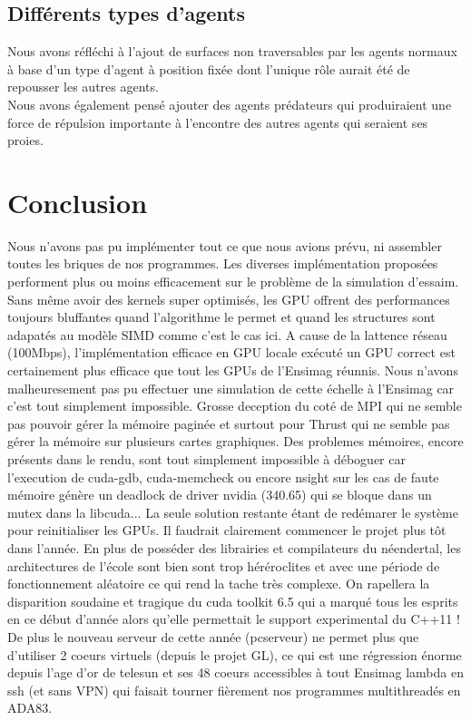 \subsection{Différents types d'agents}
Nous avons réfléchi à l'ajout de surfaces non traversables par les agents normaux à base d'un type d'agent à position fixée dont l'unique rôle aurait été de repousser les autres agents.\\
Nous avons également pensé ajouter des agents prédateurs qui produiraient une force de répulsion importante à l'encontre des autres agents qui seraient ses proies.


\section{Conclusion}

Nous n'avons pas pu implémenter tout ce que nous avions prévu, ni assembler toutes les briques de nos programmes. 
Les diverses implémentation proposées performent plus ou moins efficacement sur le problème de la simulation d'essaim.
\vskip 0.2cm
Sans même avoir des kernels super optimisés, les GPU offrent des performances toujours bluffantes quand l'algorithme le permet et quand les structures sont adapatés au modèle SIMD comme c'est le cas ici.
\vskip 0.2cm
A cause de la lattence réseau (100Mbps), l'implémentation efficace en GPU locale exécuté un GPU correct est certainement plus efficace que tout les GPUs de l'Ensimag réunnis. Nous n'avons malheuresement pas pu effectuer une simulation de cette échelle à l'Ensimag car c'est tout simplement impossible.
\vskip 0.2cm
Grosse deception du coté de MPI qui ne semble pas pouvoir gérer la mémoire paginée et surtout pour Thrust qui ne semble pas gérer la mémoire sur plusieurs cartes graphiques. Des problemes mémoires, encore présents dans le rendu, sont tout simplement impossible à déboguer car l'execution de cuda-gdb, cuda-memcheck ou encore nsight sur les cas de faute mémoire génère un deadlock de driver nvidia (340.65) qui se bloque dans un mutex dans la libcuda... La seule solution restante étant de redémarer le système pour reinitialiser les GPUs.
\vskip 0.2cm
Il faudrait clairement commencer le projet plus tôt dans l'année. En plus de posséder des librairies et compilateurs du néendertal, les architectures de l'école sont bien sont trop héréroclites et avec une période de fonctionnement aléatoire ce qui rend la tache très complexe. On rapellera la disparition soudaine et tragique du cuda toolkit 6.5 qui a marqué tous les esprits en ce début d'année alors qu'elle permettait le support experimental du C++11 ! De plus le nouveau serveur de cette année (pcserveur) ne permet plus que d'utiliser 2 coeurs virtuels (depuis le projet GL), ce qui est une régression énorme depuis l'age d'or de telesun et ses 48 coeurs accessibles à tout Ensimag lambda en ssh (et sans VPN) qui faisait tourner fièrement nos programmes multithreadés en ADA83. 


